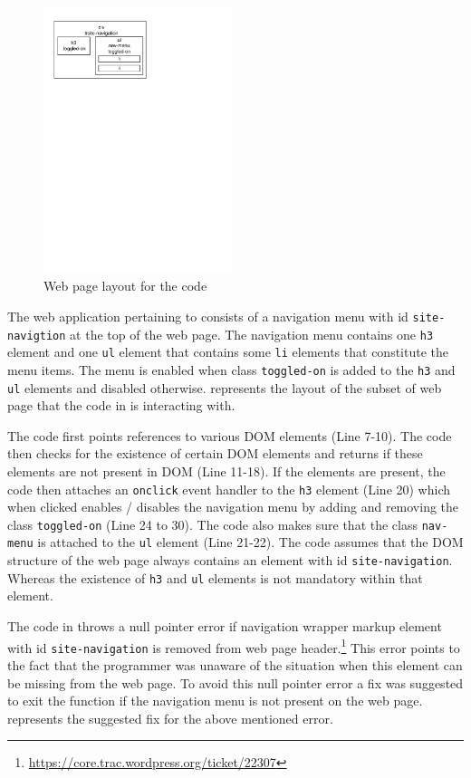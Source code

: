 	\begin{figure}
		\centering
		\includegraphics[width=55mm]{images/layout.pdf}
		\caption{Web page layout for the \javascript code}
		\label{Fig:Layout}
	\end{figure}
	
	The web application pertaining to  consists of a navigation menu with id \texttt{site-navigtion} at the top of the web page. The navigation menu contains one \texttt{h3} element and one \texttt{ul} element that contains some \texttt{li} elements that constitute the menu items. The menu is enabled when class \texttt{toggled-on} is added to the \texttt{h3} and \texttt{ul} elements and disabled otherwise.  represents the layout of the subset of web page that the \javascript code in  is interacting with.
	
	The \javascript code first points references to various DOM elements (Line 7-10). The code then checks for the existence of certain DOM elements and returns if these elements are not present in DOM (Line 11-18). If the elements are present, the code then attaches an \texttt{onclick} event handler to the \texttt{h3} element (Line 20) which when clicked enables / disables the navigation menu by adding and removing the class \texttt{toggled-on} (Line 24 to 30). The code also makes sure that the class \texttt{nav-menu} is attached to the \texttt{ul} element (Line 21-22). The \javascript code assumes that the DOM structure of the web page always contains an element with id \texttt{site-navigation}. Whereas the existence of \texttt{h3} and \texttt{ul} elements is not mandatory within that element.
		
	The \javascript code in  throws a null pointer error if navigation wrapper markup \ie element with id \texttt{site-navigation} is removed from web page header.\footnote{\url{https://core.trac.wordpress.org/ticket/22307}} This error points to the fact that the programmer was unaware of the situation when this element can be missing from the web page. To avoid this null pointer error a fix was suggested to exit the function if the navigation menu is not present on the web page.  represents the suggested fix for the above mentioned error.
	
